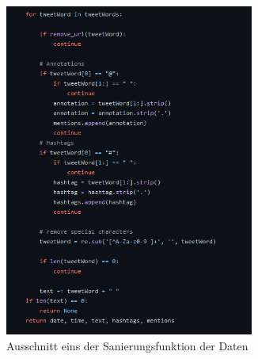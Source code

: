 	\begin{figure}[ht]
		\centering
		\includegraphics[width=0.73\textwidth]{images/Kapitel2/Code_Datensanierung_3}
		\caption{\label{fig:DataSanF2}Ausschnitt eins der Sanierungsfunktion der Daten}
	\end{figure}